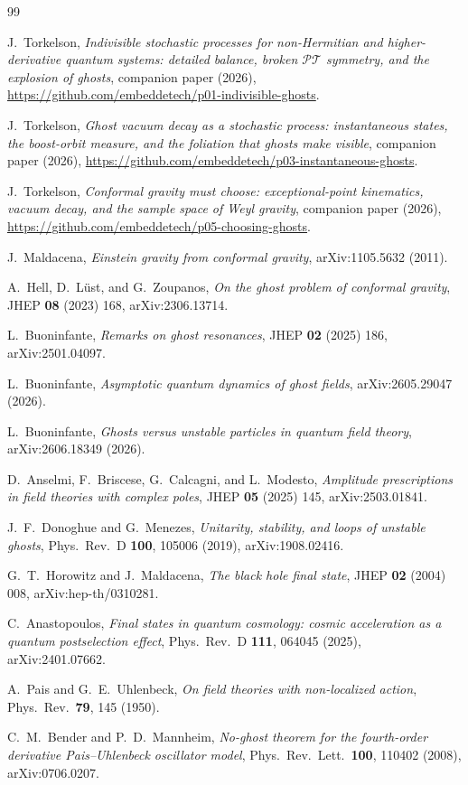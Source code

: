 \documentclass[11pt]{article}
\theoremstyle{definition}
\theoremstyle{remark}
\newcommand{\PT}{\mathcal{PT}}
\begin{document}
\begin{thebibliography}{99}\small

J.~Torkelson,
\emph{Indivisible stochastic processes for non-Hermitian and
higher-derivative quantum systems: detailed balance, broken $\PT$
symmetry, and the explosion of ghosts},
companion paper (2026),
\url{https://github.com/embeddetech/p01-indivisible-ghosts}.

J.~Torkelson,
\emph{Ghost vacuum decay as a stochastic process: instantaneous
states, the boost-orbit measure, and the foliation that ghosts make
visible},
companion paper (2026),
\url{https://github.com/embeddetech/p03-instantaneous-ghosts}.

J.~Torkelson,
\emph{Conformal gravity must choose: exceptional-point kinematics,
vacuum decay, and the sample space of Weyl gravity},
companion paper (2026),
\url{https://github.com/embeddetech/p05-choosing-ghosts}.

J.~Maldacena,
\emph{Einstein gravity from conformal gravity},
arXiv:1105.5632 (2011).

A.~Hell, D.~L\"ust, and G.~Zoupanos,
\emph{On the ghost problem of conformal gravity},
JHEP \textbf{08} (2023) 168, arXiv:2306.13714.

L.~Buoninfante,
\emph{Remarks on ghost resonances},
JHEP \textbf{02} (2025) 186, arXiv:2501.04097.

L.~Buoninfante,
\emph{Asymptotic quantum dynamics of ghost fields},
arXiv:2605.29047 (2026).

L.~Buoninfante,
\emph{Ghosts versus unstable particles in quantum field theory},
arXiv:2606.18349 (2026).

D.~Anselmi, F.~Briscese, G.~Calcagni, and L.~Modesto,
\emph{Amplitude prescriptions in field theories with complex poles},
JHEP \textbf{05} (2025) 145, arXiv:2503.01841.

J.~F.~Donoghue and G.~Menezes,
\emph{Unitarity, stability, and loops of unstable ghosts},
Phys.\ Rev.\ D \textbf{100}, 105006 (2019), arXiv:1908.02416.

G.~T.~Horowitz and J.~Maldacena,
\emph{The black hole final state},
JHEP \textbf{02} (2004) 008, arXiv:hep-th/0310281.

C.~Anastopoulos,
\emph{Final states in quantum cosmology: cosmic acceleration as a
quantum postselection effect},
Phys.\ Rev.\ D \textbf{111}, 064045 (2025), arXiv:2401.07662.

A.~Pais and G.~E.~Uhlenbeck,
\emph{On field theories with non-localized action},
Phys.\ Rev.\ \textbf{79}, 145 (1950).

C.~M.~Bender and P.~D.~Mannheim,
\emph{No-ghost theorem for the fourth-order derivative
Pais--Uhlenbeck oscillator model},
Phys.\ Rev.\ Lett.\ \textbf{100}, 110402 (2008), arXiv:0706.0207.

\end{thebibliography}
\end{document}
